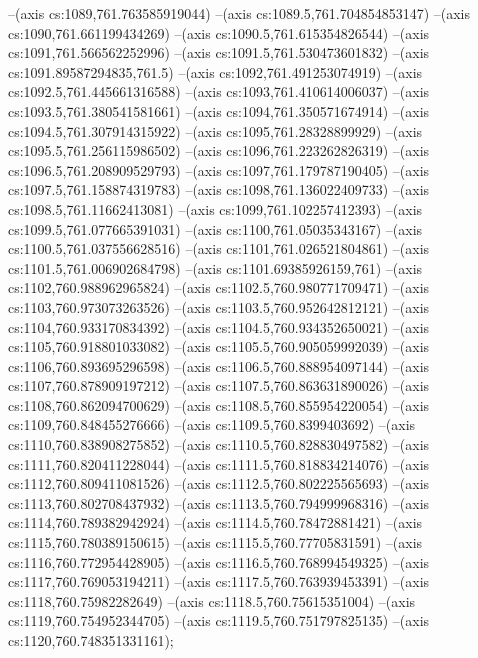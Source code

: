 --(axis cs:1089,761.763585919044)
--(axis cs:1089.5,761.704854853147)
--(axis cs:1090,761.661199434269)
--(axis cs:1090.5,761.615354826544)
--(axis cs:1091,761.566562252996)
--(axis cs:1091.5,761.530473601832)
--(axis cs:1091.89587294835,761.5)
--(axis cs:1092,761.491253074919)
--(axis cs:1092.5,761.445661316588)
--(axis cs:1093,761.410614006037)
--(axis cs:1093.5,761.380541581661)
--(axis cs:1094,761.350571674914)
--(axis cs:1094.5,761.307914315922)
--(axis cs:1095,761.28328899929)
--(axis cs:1095.5,761.256115986502)
--(axis cs:1096,761.223262826319)
--(axis cs:1096.5,761.208909529793)
--(axis cs:1097,761.179787190405)
--(axis cs:1097.5,761.158874319783)
--(axis cs:1098,761.136022409733)
--(axis cs:1098.5,761.11662413081)
--(axis cs:1099,761.102257412393)
--(axis cs:1099.5,761.077665391031)
--(axis cs:1100,761.05035343167)
--(axis cs:1100.5,761.037556628516)
--(axis cs:1101,761.026521804861)
--(axis cs:1101.5,761.006902684798)
--(axis cs:1101.69385926159,761)
--(axis cs:1102,760.988962965824)
--(axis cs:1102.5,760.980771709471)
--(axis cs:1103,760.973073263526)
--(axis cs:1103.5,760.952642812121)
--(axis cs:1104,760.933170834392)
--(axis cs:1104.5,760.934352650021)
--(axis cs:1105,760.918801033082)
--(axis cs:1105.5,760.905059992039)
--(axis cs:1106,760.893695296598)
--(axis cs:1106.5,760.888954097144)
--(axis cs:1107,760.878909197212)
--(axis cs:1107.5,760.863631890026)
--(axis cs:1108,760.862094700629)
--(axis cs:1108.5,760.855954220054)
--(axis cs:1109,760.848455276666)
--(axis cs:1109.5,760.8399403692)
--(axis cs:1110,760.838908275852)
--(axis cs:1110.5,760.828830497582)
--(axis cs:1111,760.820411228044)
--(axis cs:1111.5,760.818834214076)
--(axis cs:1112,760.809411081526)
--(axis cs:1112.5,760.802225565693)
--(axis cs:1113,760.802708437932)
--(axis cs:1113.5,760.794999968316)
--(axis cs:1114,760.789382942924)
--(axis cs:1114.5,760.78472881421)
--(axis cs:1115,760.780389150615)
--(axis cs:1115.5,760.77705831591)
--(axis cs:1116,760.772954428905)
--(axis cs:1116.5,760.768994549325)
--(axis cs:1117,760.769053194211)
--(axis cs:1117.5,760.763939453391)
--(axis cs:1118,760.75982282649)
--(axis cs:1118.5,760.75615351004)
--(axis cs:1119,760.754952344705)
--(axis cs:1119.5,760.751797825135)
--(axis cs:1120,760.748351331161);
